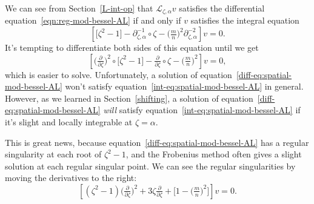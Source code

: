 \documentclass{article}
\theoremstyle{definition}
\newcommand{\fracderiv}[3]{\partial^{#1}_{#2, #3}}
\newcommand{\laplace}{\mathcal{L}}
\begin{document}
We can see from Section~\ref{L-int-op} that $\laplace_{\zeta, \alpha} v$ satisfies the differential equation~\eqref{eqn:reg-mod-bessel-AL} if and only if $v$ satisfies the integral equation
\begin{equation}\label{int-eq:spatial-mod-bessel-AL}
\left[ \big[ \zeta^2 - 1 \big] - \fracderiv{-1}{\zeta}{\alpha} \circ \zeta - \big(\tfrac{m}{n}\big)^2 \fracderiv{-2}{\zeta}{\alpha} \right] v = 0.
\end{equation}
It's tempting to differentiate both sides of this equation until we get
\begin{equation}\label{diff-eq:spatial-mod-bessel-AL}
\left[ \big(\tfrac{\partial}{\partial \zeta}\big)^2 \circ \big[ \zeta^2 - 1 \big] - \tfrac{\partial}{\partial \zeta} \circ \zeta - \big(\tfrac{m}{n}\big)^2 \right] v = 0,
\end{equation}
which is easier to solve. Unfortunately, a solution of equation~\eqref{diff-eq:spatial-mod-bessel-AL} won't satisfy equation~\eqref{int-eq:spatial-mod-bessel-AL} in general. However, as we learned in Section~\ref{shifting}, a solution of equation~\eqref{diff-eq:spatial-mod-bessel-AL} {\em will} satisfy equation~\eqref{int-eq:spatial-mod-bessel-AL} if it's slight and locally integrable at $\zeta = \alpha$.

This is great news, because equation~\ref{diff-eq:spatial-mod-bessel-AL} has a regular singularity at each root of $\zeta^2 - 1$, and the Frobenius method often gives a slight solution at each regular singular point. We can see the regular singularities by moving the derivatives to the right:
\[ \left[ (\zeta^2 - 1) \big(\tfrac{\partial}{\partial \zeta}\big)^2 + 3\zeta \tfrac{\partial}{\partial \zeta} + \big[ 1 - \big(\tfrac{m}{n}\big)^2 \big] \right] v = 0. \]
\end{document}

